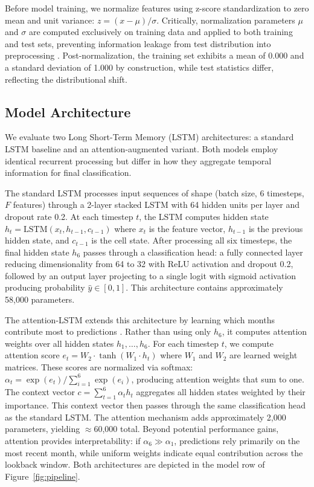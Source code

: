 \documentclass[pdflatex,sn-mathphys-num]{sn-jnl}%
\theoremstyle{thmstyleone}%
\theoremstyle{thmstyletwo}%
\theoremstyle{thmstylethree}%
\begin{document}
Before model training, we normalize features using z-score standardization to zero mean and unit variance: $z = (x - \mu) / \sigma$. Critically, normalization parameters $\mu$ and $\sigma$ are computed exclusively on training data and applied to both training and test sets, preventing information leakage from test distribution into preprocessing \cite{lecun2012efficient}. Post-normalization, the training set exhibits a mean of 0.000 and a standard deviation of 1.000 by construction, while test statistics differ, reflecting the distributional shift.

\subsection{Model Architecture}

We evaluate two Long Short-Term Memory (LSTM) architectures: a standard LSTM baseline and an attention-augmented variant. Both models employ identical recurrent processing but differ in how they aggregate temporal information for final classification.

The standard LSTM processes input sequences of shape (batch size, 6 timesteps, $F$ features) through a 2-layer stacked LSTM with 64 hidden units per layer and dropout rate 0.2. At each timestep $t$, the LSTM computes hidden state $h_t = \text{LSTM}(x_t, h_{t-1}, c_{t-1})$ where $x_t$ is the feature vector, $h_{t-1}$ is the previous hidden state, and $c_{t-1}$ is the cell state. After processing all six timesteps, the final hidden state $h_6$ passes through a classification head: a fully connected layer reducing dimensionality from 64 to 32 with ReLU activation and dropout 0.2, followed by an output layer projecting to a single logit with sigmoid activation producing probability $\hat{y} \in [0,1]$. This architecture contains approximately 58,000 parameters.

The attention-LSTM extends this architecture by learning which months contribute most to predictions \cite{malhotra2015long}. Rather than using only $h_6$, it computes attention weights over all hidden states $h_1, \ldots, h_6$. For each timestep $t$, we compute attention score $e_t = W_2 \cdot \tanh(W_1 \cdot h_t)$ where $W_1$ and $W_2$ are learned weight matrices. These scores are normalized via softmax: $\alpha_t = \exp(e_t) / \sum_{i=1}^6 \exp(e_i)$, producing attention weights that sum to one. The context vector $c = \sum_{t=1}^6 \alpha_t h_t$ aggregates all hidden states weighted by their importance. This context vector then passes through the same classification head as the standard LSTM. The attention mechanism adds approximately 2,000 parameters, yielding ${\approx}$60,000 total. Beyond potential performance gains, attention provides interpretability: if $\alpha_6 \gg \alpha_1$, predictions rely primarily on the most recent month, while uniform weights indicate equal contribution across the lookback window. Both architectures are depicted in the model row of Figure~\ref{fig:pipeline}.
\end{document}
